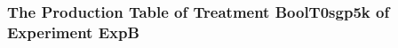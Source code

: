  \begin{frame}
 \fontsize{8pt}{9pt}\selectfont
 \frametitle{ The Production Table of Treatment BoolT0sgp5k of Experiment ExpB }

 \label{ExpBGrammarTable003.tex}  
 \end{frame}


